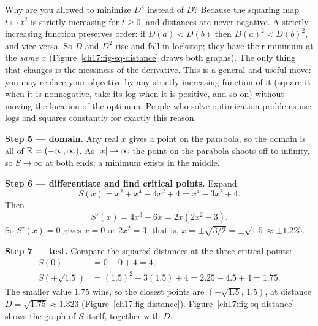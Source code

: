 \begin{whybox}
Why are you allowed to minimize $D^2$ instead of $D$? Because the squaring map
$t\mapsto t^2$ is strictly increasing for $t\ge 0$, and distances are never negative.
A strictly increasing function preserves order: if $D(a) < D(b)$ then $D(a)^2 <
D(b)^2$, and vice versa. So $D$ and $D^2$ rise and fall in lockstep; they have their
minimum at the \emph{same} $x$ (Figure~\ref{ch17:fig-sq-distance} draws both
graphs). The only thing that changes is the messiness of the
derivative. This is a general and useful move: you may replace your objective by
any strictly increasing function of it (square it when it is nonnegative, take its
log when it is positive, and so on) without moving the location of the optimum.
People who solve optimization problems use logs and squares constantly for
exactly this reason.
\end{whybox}

\textbf{Step 5 --- domain.} Any real $x$ gives a point on the parabola, so the domain
is all of $\mathbb{R} = (-\infty, \infty)$. As $\lvert x\rvert\to\infty$ the point on the parabola
shoots off to infinity, so $S\to\infty$ at both ends; a minimum exists in the middle.

\textbf{Step 6 --- differentiate and find critical points.} Expand:
\[
S(x) = x^2 + x^4 - 4x^2 + 4 = x^4 - 3x^2 + 4.
\]
Then
\[
S'(x) = 4x^3 - 6x = 2x(2x^2 - 3).
\]
So $S'(x)=0$ gives $x=0$ or $2x^2=3$, that is,
$x = \pm\sqrt{3/2} = \pm\sqrt{1.5} \approx \pm 1.225$.

\textbf{Step 7 --- test.} Compare the squared distances at the three critical points:
\begin{align*}
S(0) &= 0 - 0 + 4 = 4,\\
S\!\left(\pm\sqrt{1.5}\right) &= (1.5)^2 - 3(1.5) + 4 = 2.25 - 4.5 + 4 = 1.75.
\end{align*}
The smaller value $1.75$ wins, so the closest points are
$\left(\pm\sqrt{1.5},\, 1.5\right)$, at distance $D = \sqrt{1.75} \approx 1.323$
(Figure~\ref{ch17:fig-distance}). Figure~\ref{ch17:fig-sq-distance} shows the graph
of $S$ itself, together with $D$.

